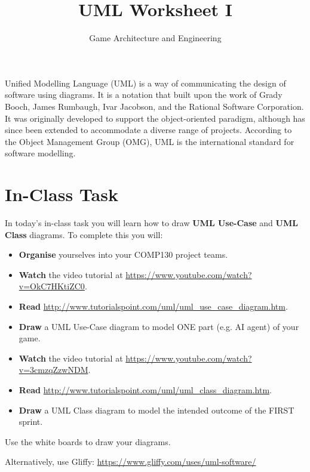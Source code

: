 \documentclass{scrartcl}
\begin{document}
\title{UML Worksheet I}
\author{Game Architecture and Engineering}
\date{}

\maketitle

Unified Modelling Language (UML) is a way of communicating the design of software using diagrams. It is a notation that built upon the work of Grady Booch, James Rumbaugh, Ivar Jacobson, and the Rational Software Corporation. It was originally developed to support the object-oriented paradigm, although has since been extended to accommodate a diverse range of projects. According to the Object Management Group (OMG), UML is the international standard for software modelling.

\section{In-Class Task}

In today's in-class task you will learn how to draw \textbf{UML Use-Case} and \textbf{UML Class} diagrams. To complete this you will:

\begin{itemize}
	\item \textbf{Organise} yourselves into your COMP130 project teams.
	\item \textbf{Watch} the video tutorial at \url{https://www.youtube.com/watch?v=OkC7HKtiZC0}.
	\item \textbf{Read} \url{http://www.tutorialspoint.com/uml/uml_use_case_diagram.htm}.
	\item \textbf{Draw} a UML Use-Case diagram to model ONE part (e.g. AI agent) of your game.
	\item \textbf{Watch} the video tutorial at \url{https://www.youtube.com/watch?v=3cmzqZzwNDM}.
	\item \textbf{Read} \url{http://www.tutorialspoint.com/uml/uml_class_diagram.htm}.
	\item \textbf{Draw} a UML Class diagram to model the intended outcome of the FIRST sprint.
\end{itemize}

\vspace{1ex}

Use the white boards to draw your diagrams.
 
Alternatively, use Gliffy: \url{https://www.gliffy.com/uses/uml-software/}
\end{document}
